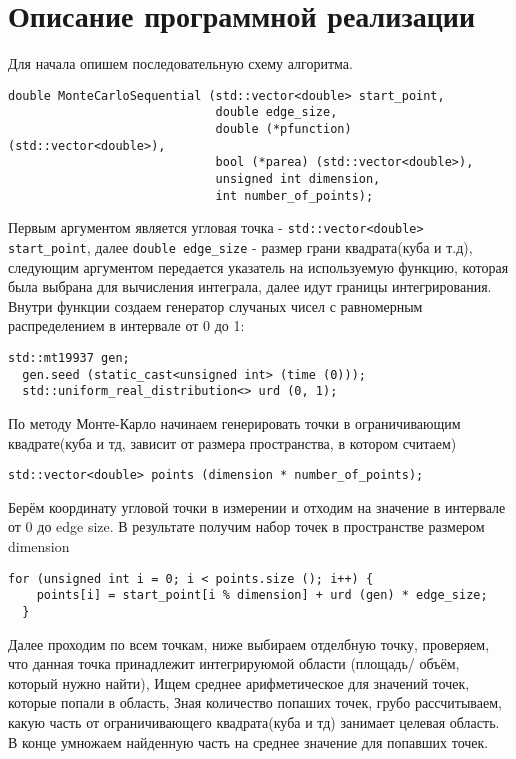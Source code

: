 \documentclass{report}
\begin{document}
\section*{Описание программной реализации}
\par Для начала опишем последовательную схему алгоритма.
\begin{lstlisting}
double MonteCarloSequential (std::vector<double> start_point,
                             double edge_size,
                             double (*pfunction) (std::vector<double>),
                             bool (*parea) (std::vector<double>),
                             unsigned int dimension,
                             int number_of_points);
\end{lstlisting}
Первым аргументом является угловая точка - \lstinline$std::vector<double> start_point$, далее \lstinline$double edge_size$ - размер грани квадрата(куба и т.д), следующим аргументом передается указатель на используемую функцию, которая была выбрана для вычисления интеграла, далее идут границы интегрирования.
Внутри функции создаем генератор случаных чисел с равномерным распределением в интервале от 0 до 1:
\begin{lstlisting}
std::mt19937 gen;
  gen.seed (static_cast<unsigned int> (time (0)));
  std::uniform_real_distribution<> urd (0, 1);
\end{lstlisting}
По методу Монте-Карло начинаем генерировать точки в ограничивающим квадрате(куба и тд, зависит от размера пространства, в котором считаем)
\begin{lstlisting}
std::vector<double> points (dimension * number_of_points);
\end{lstlisting}
Берём координату угловой точки в измерении и отходим на значение в интервале от 0 до edge size. В результате получим набор точек в пространстве размером dimension \begin{lstlisting}
for (unsigned int i = 0; i < points.size (); i++) {
    points[i] = start_point[i % dimension] + urd (gen) * edge_size;
  }\end{lstlisting}
Далее проходим по всем точкам, ниже выбираем отделбную точку, проверяем, что данная точка принадлежит интегрируюмой области (площадь/ объём, который нужно найти), Ищем среднее арифметическое для значений точек, которые попали в область, Зная количество попаших точек, грубо рассчитываем, какую часть от ограничивающего квадрата(куба и тд) занимает целевая область. В конце умножаем найденную часть на среднее значение для попавших точек.
\end{document}
